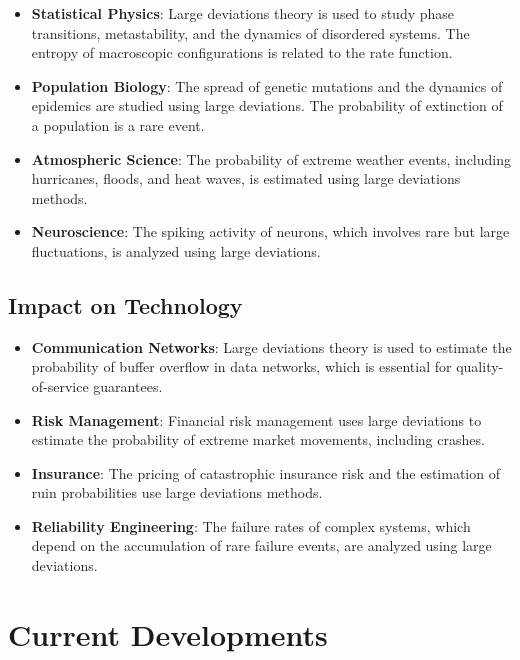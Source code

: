 \begin{itemize}
\item \textbf{Statistical Physics}: Large deviations theory is used to study phase transitions, metastability, and the dynamics of disordered systems. The entropy of macroscopic configurations is related to the rate function.

\item \textbf{Population Biology}: The spread of genetic mutations and the dynamics of epidemics are studied using large deviations. The probability of extinction of a population is a rare event.

\item \textbf{Atmospheric Science}: The probability of extreme weather events, including hurricanes, floods, and heat waves, is estimated using large deviations methods.

\item \textbf{Neuroscience}: The spiking activity of neurons, which involves rare but large fluctuations, is analyzed using large deviations.
\end{itemize}

\subsection{Impact on Technology}

\begin{itemize}
\item \textbf{Communication Networks}: Large deviations theory is used to estimate the probability of buffer overflow in data networks, which is essential for quality-of-service guarantees.

\item \textbf{Risk Management}: Financial risk management uses large deviations to estimate the probability of extreme market movements, including crashes.

\item \textbf{Insurance}: The pricing of catastrophic insurance risk and the estimation of ruin probabilities use large deviations methods.

\item \textbf{Reliability Engineering}: The failure rates of complex systems, which depend on the accumulation of rare failure events, are analyzed using large deviations.
\end{itemize}

\section{Current Developments}

